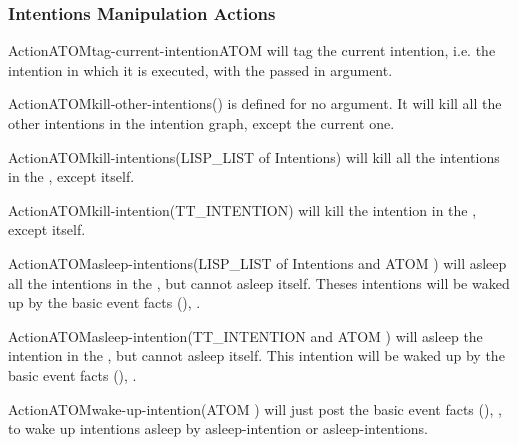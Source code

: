 \subsubsection{Intentions Manipulation Actions}

\begin{typeefa}{Action}{ATOM}{tag-current-intention}{ATOM }
will tag the current intention, i.e. the intention in which it is executed, with
the  passed in argument.
\end{typeefa}

\begin{typeefa}{Action}{ATOM}{kill-other-intentions}{()}
is defined for no argument. It will kill all the other intentions in the
intention graph, except the current one.
\end{typeefa}

\begin{typeefa}{Action}{ATOM}{kill-intentions}{(LISP\_LIST of Intentions)}
will kill all the intentions in the , except itself.
\end{typeefa}

\begin{typeefa}{Action}{ATOM}{kill-intention}{(TT\_INTENTION)}
will kill the intention in the , except itself.
\end{typeefa}

\begin{typeefa}{Action}{ATOM}{asleep-intentions}{(LISP\_LIST of Intentions and ATOM )}
will asleep all the intentions in the , but cannot asleep itself.
Theses intentions will be waked up by the basic event facts (),  .
\end{typeefa}

\begin{typeefa}{Action}{ATOM}{asleep-intention}{(TT\_INTENTION and ATOM )}
will asleep the intention in the , but cannot asleep itself.
This intention will be waked up by the basic event facts (),  .
\end{typeefa}

\begin{typeefa}{Action}{ATOM}{wake-up-intention}{(ATOM )}
will just post the basic event facts (),
, to wake up intentions
asleep by asleep-intention or asleep-intentions.
\end{typeefa}

